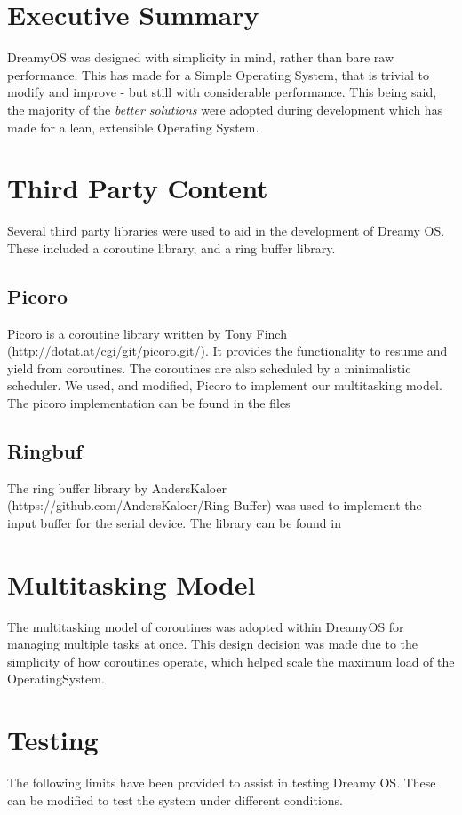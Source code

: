 \documentclass[runningheads,a4paper]{llncs}
\begin{document}
\newpage

\section{Executive Summary}
DreamyOS was designed with simplicity in mind, rather than bare raw performance. This has made for a Simple Operating System, that is trivial to modify and improve - but still with considerable performance. This being said, the majority of the \textit{better solutions} were adopted during development which has made for a lean, extensible Operating System.

\section{Third Party Content}
Several third party libraries were used to aid in the development of Dreamy OS. These included a coroutine library, and a ring buffer library.

\subsection{Picoro}
Picoro is a coroutine library written by Tony Finch (http://dotat.at/cgi/git/picoro.git/). It provides the functionality to resume and yield from coroutines. The coroutines are also scheduled by a minimalistic scheduler. We used, and modified, Picoro to implement our multitasking model. The picoro implementation can be found in the files 

\subsection{Ringbuf}
The ring buffer library by AndersKaloer (https://github.com/AndersKaloer/Ring-Buffer) was used to implement the input buffer for the serial device. The library can be found in 

\section{Multitasking Model}
The multitasking model of coroutines was adopted within DreamyOS for managing multiple tasks at once. This design decision was made due to the simplicity of how coroutines operate, which helped scale the maximum load of the OperatingSystem.

\section{Testing}
The following limits have been provided to assist in testing Dreamy OS. These can be modified to test the system under different conditions.
\end{document}
